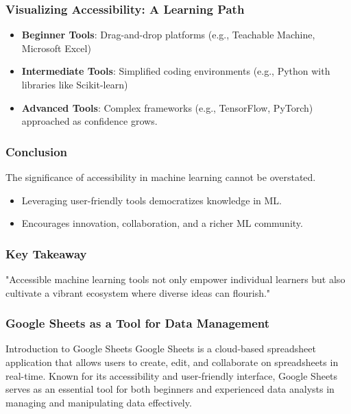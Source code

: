 \documentclass[aspectratio=169]{beamer}
\begin{document}
\begin{frame}[fragile]
    \frametitle{Visualizing Accessibility: A Learning Path}
    \begin{itemize}
        \item \textbf{Beginner Tools}: Drag-and-drop platforms (e.g., Teachable Machine, Microsoft Excel)
        \item \textbf{Intermediate Tools}: Simplified coding environments (e.g., Python with libraries like Scikit-learn)
        \item \textbf{Advanced Tools}: Complex frameworks (e.g., TensorFlow, PyTorch) approached as confidence grows.
    \end{itemize}
\end{frame}

\begin{frame}[fragile]
    \frametitle{Conclusion}
    The significance of accessibility in machine learning cannot be overstated.
    \begin{itemize}
        \item Leveraging user-friendly tools democratizes knowledge in ML.
        \item Encourages innovation, collaboration, and a richer ML community.
    \end{itemize}
\end{frame}

\begin{frame}[fragile]
    \frametitle{Key Takeaway}
    \begin{block}{}
        "Accessible machine learning tools not only empower individual learners but also cultivate a vibrant ecosystem where diverse ideas can flourish."
    \end{block}
\end{frame}

\begin{frame}[fragile]
    \frametitle{Google Sheets as a Tool for Data Management}
    \begin{block}{Introduction to Google Sheets}
        Google Sheets is a cloud-based spreadsheet application that allows users to create, edit, and collaborate on spreadsheets in real-time. Known for its accessibility and user-friendly interface, Google Sheets serves as an essential tool for both beginners and experienced data analysts in managing and manipulating data effectively.
    \end{block}
\end{frame}
\end{document}
